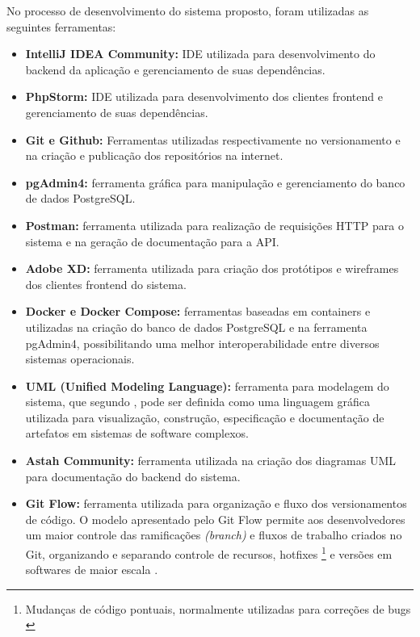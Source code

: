 No processo de desenvolvimento do sistema proposto, foram utilizadas as seguintes ferramentas:

\begin{itemize}
    \item \textbf{IntelliJ IDEA Community:} IDE utilizada para desenvolvimento do backend da aplicação e gerenciamento de suas dependências.

    \item \textbf{PhpStorm:} IDE utilizada para desenvolvimento dos clientes frontend e gerenciamento de suas dependências.

    \item \textbf{Git e Github:} Ferramentas utilizadas respectivamente no versionamento e na criação e publicação dos repositórios na internet.

    \item \textbf{pgAdmin4:} ferramenta gráfica para manipulação e gerenciamento do banco de dados PostgreSQL.
    
    \item \textbf{Postman:} ferramenta utilizada para realização de requisições HTTP para o sistema e na geração de documentação para a API.

    \item \textbf{Adobe XD:} ferramenta utilizada para criação dos protótipos e wireframes dos clientes frontend do sistema.

    \item \textbf{Docker e Docker Compose:} ferramentas baseadas em containers e utilizadas na criação do banco de dados PostgreSQL e na ferramenta pgAdmin4, possibilitando uma melhor interoperabilidade entre diversos sistemas operacionais.
    
    \item \textbf{UML (Unified Modeling Language):} ferramenta para modelagem do sistema, que segundo , pode ser definida como uma linguagem gráfica utilizada para visualização, construção, especificação e documentação de artefatos em sistemas de software complexos.
    
    \item \textbf{Astah Community:} ferramenta utilizada na criação dos diagramas UML para documentação do backend do sistema.
    
    \item \textbf{Git Flow:} ferramenta utilizada para organização e fluxo dos versionamentos de código. O modelo apresentado pelo Git Flow permite aos desenvolvedores um maior controle das ramificações \textit{(branch)} e fluxos de trabalho criados no Git, organizando e separando controle de recursos, hotfixes \footnote{Mudanças de código pontuais, normalmente utilizadas para correções de bugs \cite{chopra2014automated}} e versões em softwares de maior escala \cite{kreeftmeijer2015using}.
\end{itemize}

